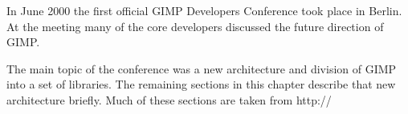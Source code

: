 In June 2000 the first official GIMP Developers Conference took place in
Berlin. At the meeting many of the core developers discussed the future
direction of GIMP.

The main topic of the conference was a new architecture and division of GIMP
into a set of libraries. The remaining sections in this chapter describe that
new architecture briefly. Much of these sections are taken from http:// 

